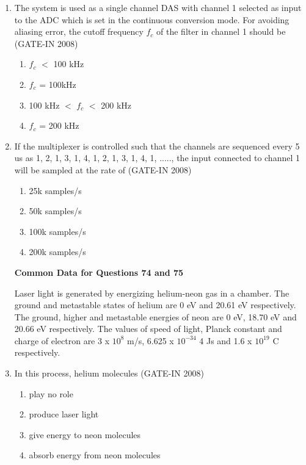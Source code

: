 \documentclass[journal,12pt,onecolumn]{IEEEtran}
\theoremstyle{remark}
\begin{document}
\begin{enumerate}
\item  The system is used as a single channel DAS with channel 1 selected as input to the ADC which is
set in the continuous conversion mode. For avoiding aliasing error, the cutoff frequency $f_c$ of the
filter in channel 1 should be \hfill{(GATE-IN 2008)}
\begin{multicols}{2}
           \begin{enumerate} 
              \item $f_c$ $<$ 100 kHz         
              \item $f_c$ = 100kHz
              \item 100 kHz $<$ $f_c$ $<$ 200 kHz
              \item $f_c$ = 200 kHz
            \end{enumerate}
            \end{multicols}

\item If the multiplexer is controlled such that the channels are sequenced every 5 us as 1, 2, 1, 3, 1, 4, 1,
2, 1, 3, 1, 4, 1, ....., the input connected to channel 1 will be sampled at the rate of \hfill{(GATE-IN 2008)}
\begin{multicols}{4}
           \begin{enumerate} 
              \item 25k samples/s           
              \item 50k samples/s
              \item 100k samples/s
              \item 200k samples/s
            \end{enumerate}
            \end{multicols}

\textbf{Common Data for Questions 74 and 75}

Laser light is generated by energizing helium-neon gas in a chamber. The ground and metastable states of
helium are 0 eV and 20.61 eV respectively. The ground, higher and metastable energies of neon are 0 eV,
18.70 eV and 20.66 eV respectively. The values of speed of light, Planck constant and charge of electron
are 3 x $10^{8}$  m/s, 6.625 x $10^{-34}$ 4 Js and 1.6 x $10^{19}$ C respectively.


 \item In this process, helium molecules \hfill{(GATE-IN 2008)}
 \begin{multicols}{2}
           \begin{enumerate} 
              \item  play no role        
              \item  produce laser light
              \item  give energy to neon molecules
              \item  absorb energy from neon molecules
            \end{enumerate}
\end{multicols}



\end{enumerate}
\end{document}
